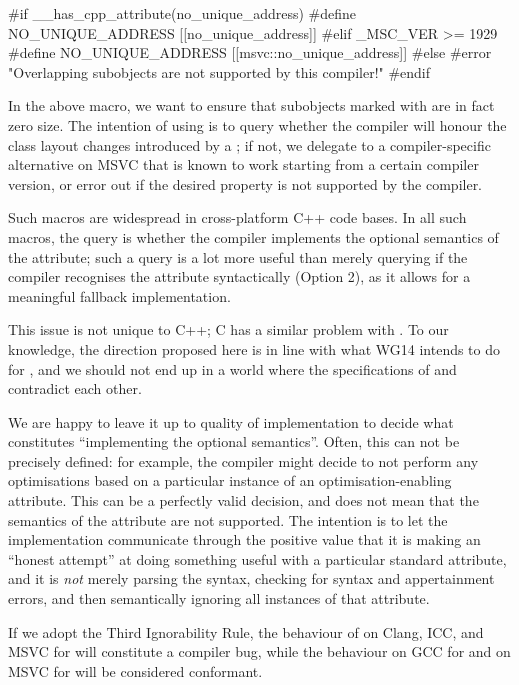 \begin{codeblock}
#if __has_cpp_attribute(no_unique_address)
  #define NO_UNIQUE_ADDRESS [[no_unique_address]]
#elif _MSC_VER >= 1929
  #define NO_UNIQUE_ADDRESS [[msvc::no_unique_address]]
#else
  #error "Overlapping subobjects are not supported by this compiler!"
#endif
\end{codeblock}

In the above macro, we want to ensure that subobjects marked with  are in fact zero size. The intention of using   is to query whether the compiler will honour the class layout changes introduced by a ; if not, we delegate to a compiler-specific alternative on MSVC that is known to work starting from a certain compiler version, or error out if the desired property is not supported by the compiler.

Such macros are widespread in cross-platform C++ code bases. In all such macros, the query is whether the compiler implements the optional semantics of the attribute; such a query is a lot more useful than merely querying if the compiler recognises the attribute syntactically (Option 2), as it allows for a meaningful fallback implementation.

This issue is not unique to C++; C has a similar problem with . To our knowledge, the direction proposed here is in line with what WG14 intends to do for , and we should not end up in a world where the specifications of  and  contradict each other.

We are happy to leave it up to quality of implementation to decide what constitutes ``implementing the optional semantics''. Often, this can not be precisely defined: for example, the compiler might decide to not perform any optimisations based on a particular instance of an optimisation-enabling attribute. This can be a perfectly valid decision, and does not mean that the semantics of the attribute are not supported. The intention is to let the implementation communicate through the positive value that it is making an ``honest attempt'' at doing something useful with a particular standard attribute, and it is \emph{not} merely parsing the syntax, checking for syntax and appertainment errors, and then semantically ignoring all instances of that attribute.

If we adopt the Third Ignorability Rule, the behaviour of  on Clang, ICC, and MSVC for  will constitute a compiler bug, while the behaviour on GCC for \mbox{} and on MSVC for  will be considered conformant.

